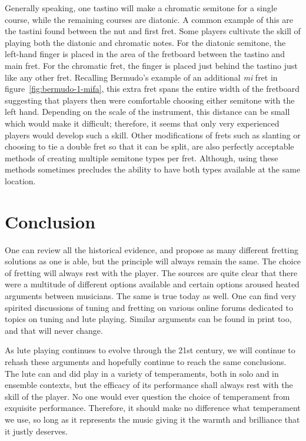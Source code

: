 Generally speaking, one tastino will make a chromatic semitone for a single course,
while the remaining courses are diatonic.  A common example of this are the tastini
found between the nut and first fret.  Some players cultivate the skill of playing both
the diatonic and chromatic notes.  For the diatonic semitone, the left-hand finger is
placed in the area of the fretboard between the tastino and main fret.  For the
chromatic fret, the finger is placed just behind the tastino just like any other fret.
Recalling Bermudo's example of an additional \textit{mi} fret in
figure~\ref{fig:bermudo-1-mifa}, this extra fret spans the entire width of the
fretboard suggesting that players then were comfortable choosing either semitone with
the left hand.  Depending on the scale of the instrument, this distance can be small
which would make it difficult; therefore, it seems that only very experienced players
would develop such a skill. Other modifications of frets such as slanting or choosing
to tie a double fret so that it can be split, are also perfectly acceptable methods of
creating multiple semitone types per fret. Although, using these methods sometimes
precludes the ability to have both types available at the same location.

\section{Conclusion}

One can review all the historical evidence, and propose as many different fretting
solutions as one is able, but the principle will always remain the same. The choice
of fretting will always rest with the player. The sources are quite clear that there
were a multitude of different options available and certain options aroused heated
arguments between musicians. The same is true today as well. One can find very
spirited discussions of tuning and fretting on various online forums dedicated to
topics on tuning and lute playing. Similar arguments can be found in print too, and
that will never change. \autocite{DD:4}

As lute playing continues to evolve through the 21st century, we will continue to
rehash these arguments and hopefully continue to reach the same conclusions. The lute
can and did play in a variety of temperaments, both in solo and in ensemble contexts,
but the efficacy of its performance shall always rest with the skill of the player. No
one would ever question the choice of temperament from exquisite performance.
Therefore, it should make no difference what temperament we use, so long as it
represents the music giving it the warmth and brilliance that it justly deserves.